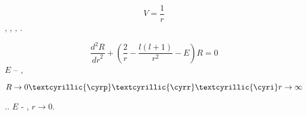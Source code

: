 \documentclass[a4paper]{article}
\begin{document}
\begin{equation*}
V=\frac 1 r
\end{equation*}
{\CYRP}{\cyrr}{\cyri} {\cyrerev}{\cyrt}{\cyro}{\cyrm} {\cyrerev}{\cyrn}{\cyre}{\cyrr}{\cyrg}{\cyri}{\cyrya},
{\cyrv}{\cyrh}{\cyro}{\cyrd}{\cyrya}{\cyrshch}{\cyra}{\cyrya} {\cyrv}
{\cyru}{\cyrr}{\cyra}{\cyrv}{\cyrn}{\cyre}{\cyrn}{\cyri}{\cyre}, {\cyrn}{\cyre}
{\cyrya}{\cyrv}{\cyrl}{\cyrya}{\cyre}{\cyrt}{\cyrs}{\cyrya} {\cyre}{\cyrg}{\cyro}
{\cyrs}{\cyro}{\cyrb}{\cyrs}{\cyrt}{\cyrv}{\cyre}{\cyrn}{\cyrn}{\cyrery}{\cyrm}
{\cyrz}{\cyrn}{\cyra}{\cyrch}{\cyre}{\cyrn}{\cyri}{\cyre}{\cyrm}, {\cyra}
{\cyrya}{\cyrv}{\cyrl}{\cyrya}{\cyre}{\cyrt}{\cyrs}{\cyrya}
{\cyrerev}{\cyrk}{\cyrs}{\cyrp}{\cyre}{\cyrr}{\cyri}{\cyrm}{\cyre}{\cyrn}{\cyrt}{\cyra}{\cyrl}{\cyrsftsn}{\cyrn}{\cyro}
{\cyri}{\cyrz}{\cyrm}{\cyre}{\cyrr}{\cyre}{\cyrn}{\cyrn}{\cyro}{\cyrishrt}
{\cyrv}{\cyre}{\cyrl}{\cyri}{\cyrch}{\cyri}{\cyrn}{\cyro}{\cyrishrt}.

\begin{equation*}
\frac{d^2R}{\mathit{dr}^2}+\left(\frac 2 r-\frac{l(l+1)}{r^2}-E\right)R=0
\end{equation*}
 $E$ -- {\cyrerev}{\cyrn}{\cyre}{\cyrr}{\cyrg}{\cyri}{\cyrya},
{\cyri}{\cyrz}{\cyrm}{\cyre}{\cyrr}{\cyre}{\cyrn}{\cyrn}{\cyra}{\cyrya}
{\cyrerev}{\cyrk}{\cyrs}{\cyrp}{\cyre}{\cyrr}{\cyri}{\cyrm}{\cyre}{\cyrn}{\cyrt}{\cyra}{\cyrl}{\cyrsftsn}{\cyrn}{\cyrery}{\cyrm}
{\cyro}{\cyrb}{\cyrr}{\cyra}{\cyrz}{\cyro}{\cyrm}

{\CYRR}{\cyre}{\cyrsh}{\cyre}{\cyrn}{\cyri}{\cyre} {\cyrd}{\cyro}{\cyrl}{\cyrzh}{\cyrn}{\cyro}
{\cyru}{\cyrd}{\cyro}{\cyrv}{\cyrl}{\cyre}{\cyrt}{\cyrv}{\cyro}{\cyrr}{\cyrya}{\cyrt}{\cyrsftsn}
{\cyrg}{\cyrr}{\cyra}{\cyrn}{\cyri}{\cyrch}{\cyrn}{\cyrery}{\cyrm}
{\cyru}{\cyrs}{\cyrl}{\cyro}{\cyrv}{\cyri}{\cyrya}{\cyrm} \newline
 $R\rightarrow
0\mathit{\text{\textcyrillic{{\cyrp}}}\text{\textcyrillic{{\cyrr}}}\text{\textcyrillic{{\cyri}}}}r\rightarrow {\infty}$

{\CYRT}.{\cyrk}.  $E$ - {\cyrn}{\cyre} {\cyrs}{\cyro}{\cyrb}{\cyrs}{\cyrt}{\cyrv}{\cyre}{\cyrn}{\cyrn}{\cyro}{\cyre}
{\cyrz}{\cyrn}{\cyra}{\cyrch}{\cyre}{\cyrn}{\cyri}{\cyre}
{\cyrd}{\cyri}{\cyrf}{\cyrf}{\cyre}{\cyrr}{\cyre}{\cyrn}{\cyrc}{\cyri}{\cyra}{\cyrl}{\cyrsftsn}{\cyrn}{\cyro}{\cyrg}{\cyro}
{\cyru}{\cyrr}{\cyra}{\cyrv}{\cyrn}{\cyre}{\cyrn}{\cyri}{\cyrya}, {\cyrr}{\cyre}{\cyrsh}{\cyre}{\cyrn}{\cyri}{\cyre}
{\cyrb}{\cyru}{\cyrd}{\cyre}{\cyrt} {\cyrr}{\cyra}{\cyrs}{\cyrh}{\cyro}{\cyrd}{\cyri}{\cyrt}{\cyrsftsn}{\cyrs}{\cyrya}
{\cyrp}{\cyrr}{\cyri}  $r\rightarrow 0$.
\end{document}
